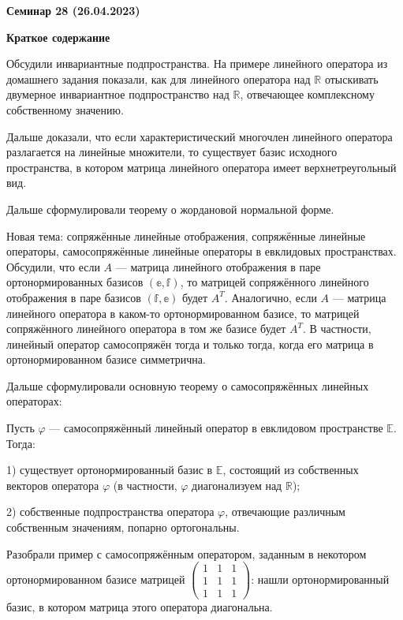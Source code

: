 \documentclass[10pt, a4paper]{extarticle}
\def \R{\mathbb{R}}
\theoremstyle{definition}
\begin{document}
\begin{center}
\small
\noindent{}
\end{center}

\large

\begin{center}
\textbf{Семинар 28 (26.04.2023)}
\end{center}

\textbf{Краткое содержание}

Обсудили инвариантные подпространства.
На примере линейного оператора из домашнего задания показали, как для линейного оператора над $\R$ отыскивать двумерное инвариантное подпространство над $\R$, отвечающее комплексному собственному значению.

Дальше доказали, что если характеристический многочлен линейного оператора разлагается на линейные множители, то существует базис исходного пространства, в котором матрица линейного оператора имеет верхнетреугольный вид.

Дальше сформулировали теорему о жордановой нормальной форме.

Новая тема: сопряжённые линейные отображения, сопряжённые линейные операторы, самосопряжённые линейные операторы в евклидовых пространствах.
Обсудили, что если $A$ --- матрица линейного отображения в паре ортонормированных базисов $(\mathbb e, \mathbb f)$, то матрицей сопряжённого линейного отображения в паре базисов $(\mathbb f, \mathbb e)$ будет $A^T$.
Аналогично, если $A$ --- матрица линейного оператора в каком-то ортонормированном базисе, то матрицей сопряжённого линейного оператора в том же базисе будет $A^T$.
В частности, линейный оператор самосопряжён тогда и только тогда, когда его матрица в ортонормированном базисе симметрична.

Дальше сформулировали основную теорему о самосопряжённых линейных операторах:

Пусть $\varphi$ --- самосопряжённый линейный оператор в евклидовом пространстве $\mathbb E$.
Тогда:

1) существует ортонормированный базис в $\mathbb E$, состоящий из собственных векторов оператора $\varphi$ (в частности, $\varphi$ диагонализуем над $\R$);

2) собственные подпространства оператора $\varphi$, отвечающие различным собственным значениям, попарно ортогональны.

Разобрали пример с самосопряжённым оператором, заданным в некотором ортонормированном базисе матрицей $\begin{pmatrix} 1 & 1 & 1\\ 1 & 1 & 1 \\ 1 & 1 & 1 \end{pmatrix}$: нашли ортонормированный базис, в котором матрица этого оператора диагональна.
\end{document}

